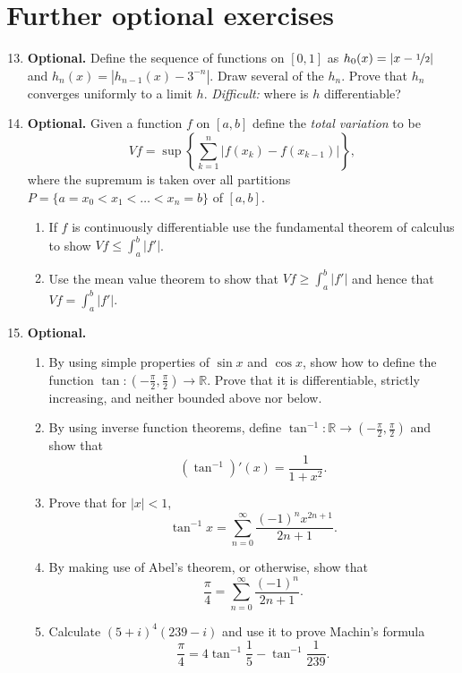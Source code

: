 \documentclass[12pt]{article}
\newcommand{\R}{\mathbb{R}}
\begin{document}
\newpage
\section*{Further optional exercises}
\begin{enumerate}
  \setcounter{enumi}{12}
  \item \textbf{Optional.} Define the sequence of functions on $[0,1]$ as
    $h_0(x)=|x-\nicefrac{1}{2}|$ and $h_n(x)=|h_{n-1}(x)-3^{-n}|$. Draw several
    of the $h_n$. Prove that $h_n$ converges uniformly to a limit $h$.
    \textit{Difficult:} where is $h$ differentiable?    
  \item \textbf{Optional.} Given a function $f$ on $[a,b]$ define the \textit{total variation}
    to be
    \begin{equation}
      Vf = \sup \left\{ \sum_{k=1}^n \left|f(x_k) - f(x_{k-1})\right| \right\},
    \end{equation}
    where the supremum is taken over all partitions $P=\{a=x_0 < x_1 < \ldots <
    x_n=b\}$ of $[a,b]$.
    \begin{enumerate}
      \item If $f$ is continuously differentiable use the fundamental
        theorem of calculus to show $Vf \le \int_a^b |f'|$.
      \item Use the mean value theorem to show that $Vf \ge \int_a^b |f'|$
        and hence that $Vf=\int_a^b |f'|.$
    \end{enumerate}
  \item \textbf{Optional.}
    \begin{enumerate}
      \item By using simple properties of $\sin x$ and $\cos x$, show how to
        define the function $\tan: (-\frac{\pi}{2},\frac{\pi}{2}) \to \R$.
        Prove that it is differentiable, strictly increasing, and neither
        bounded above nor below.
      \item By using inverse function theorems, define $\tan^{-1}: \R \to
        (-\frac{\pi}{2},\frac{\pi}{2})$ and show that
        \begin{equation}
          (\tan^{-1})'(x) = \frac{1}{1+x^2}.
        \end{equation}
      \item
        Prove that for $|x|<1$,
        \begin{equation}
          \tan^{-1} x = \sum_{n=0}^\infty \frac{(-1)^n x^{2n+1}}{2n+1}.
        \end{equation}
      \item By making use of Abel's theorem, or otherwise, show that
        \begin{equation}
          \frac{\pi}{4} = \sum_{n=0}^\infty \frac{(-1)^n}{2n+1}.
        \end{equation}
      \item Calculate $(5+i)^4(239-i)$ and use it to prove Machin's formula
        \begin{equation}
          \frac{\pi}{4} = 4\tan^{-1} \frac{1}{5} - \tan^{-1} \frac{1}{239}.
        \end{equation}
    \end{enumerate}
\end{enumerate}
\end{document}
